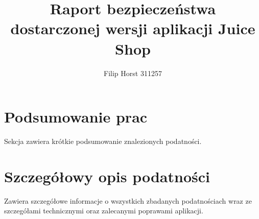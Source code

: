 \documentclass[journal,onecolumn]{IEEEtran}
\title{Raport bezpieczeństwa dostarczonej wersji aplikacji Juice Shop}
\author{Filip Horst 311257}%
\begin{document}
%
{}

\maketitle



\IEEEpeerreviewmaketitle

\section{Podsumowanie prac}
Sekcja zawiera krótkie podsumowanie znalezionych podatności.

\section{Szczegółowy opis podatności}
Zawiera szczegółowe informacje o wszystkich zbadanych podatnościach wraz ze szczegółami technicznymi oraz zalecanymi poprawami aplikacji.


%
\end{document}
